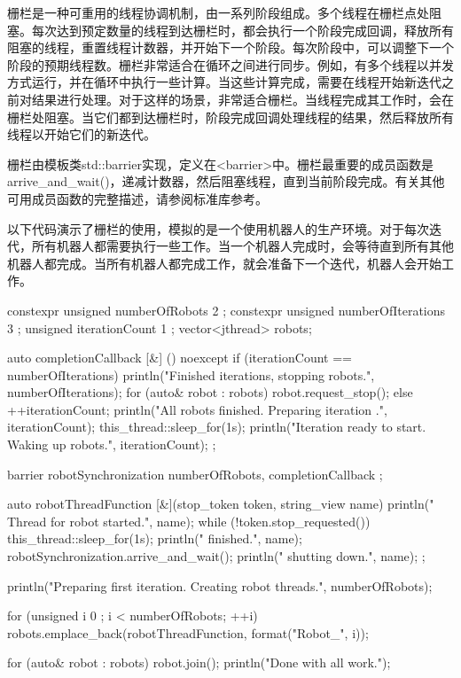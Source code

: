 栅栏是一种可重用的线程协调机制，由一系列阶段组成。多个线程在栅栏点处阻塞。每次达到预定数量的线程到达栅栏时，都会执行一个阶段完成回调，释放所有阻塞的线程，重置线程计数器，并开始下一个阶段。每次阶段中，可以调整下一个阶段的预期线程数。栅栏非常适合在循环之间进行同步。例如，有多个线程以并发方式运行，并在循环中执行一些计算。当这些计算完成，需要在线程开始新迭代之前对结果进行处理。对于这样的场景，非常适合栅栏。当线程完成其工作时，会在栅栏处阻塞。当它们都到达栅栏时，阶段完成回调处理线程的结果，然后释放所有线程以开始它们的新迭代。

栅栏由模板类std::barrier实现，定义在<barrier>中。栅栏最重要的成员函数是arrive\_and\_wait()，递减计数器，然后阻塞线程，直到当前阶段完成。有关其他可用成员函数的完整描述，请参阅标准库参考。

以下代码演示了栅栏的使用，模拟的是一个使用机器人的生产环境。对于每次迭代，所有机器人都需要执行一些工作。当一个机器人完成时，会等待直到所有其他机器人都完成。当所有机器人都完成工作，就会准备下一个迭代，机器人会开始工作。

\begin{cpp}
constexpr unsigned numberOfRobots { 2 };
constexpr unsigned numberOfIterations { 3 };
unsigned iterationCount { 1 };
vector<jthread> robots;

auto completionCallback { [&] () noexcept {
    if (iterationCount == numberOfIterations) {
        println("Finished {} iterations, stopping robots.", numberOfIterations);
        for (auto& robot : robots) { robot.request_stop(); }
    } else {
        ++iterationCount;
        println("All robots finished. Preparing iteration {}.", iterationCount);
        this_thread::sleep_for(1s);
        println("Iteration {} ready to start. Waking up robots.", iterationCount);
    }
} };

barrier robotSynchronization { numberOfRobots, completionCallback };

auto robotThreadFunction { [&](stop_token token, string_view name) {
        println(" Thread for robot {} started.", name);
        while (!token.stop_requested()) {
            this_thread::sleep_for(1s);
            println(" {} finished.", name);
            robotSynchronization.arrive_and_wait();
        }
        println(" {} shutting down.", name);
} };

println("Preparing first iteration. Creating {} robot threads.", numberOfRobots);

for (unsigned i { 0 }; i < numberOfRobots; ++i) {
    robots.emplace_back(robotThreadFunction, format("Robot_{}", i));
}

for (auto& robot : robots) { robot.join(); }
println("Done with all work.");
\end{cpp}

